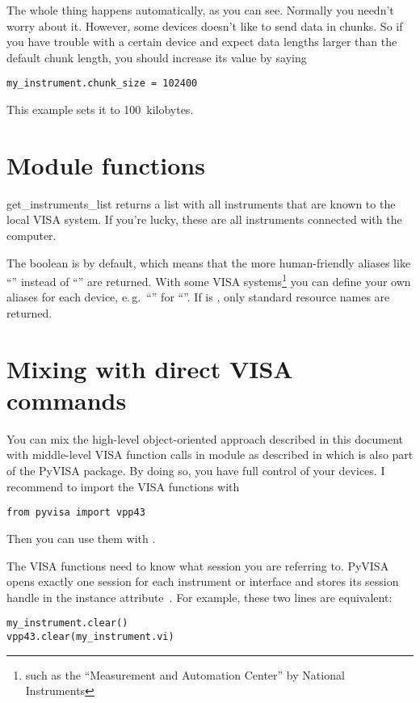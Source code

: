 \documentclass{howto}
\begin{document}
The whole thing happens automatically, as you can see.  Normally you needn't
worry about it.  However, some devices doesn't like to send data in chunks.  So
if you have trouble with a certain device and expect data lengths larger than
the default chunk length, you should increase its value by saying
\begin{verbatim}
my_instrument.chunk_size = 102400
\end{verbatim}
This example sets it to 100~kilobytes.


\section{Module functions}

\begin{funcdesc}{get_instruments_list}{}
  returns a list with all instruments that are known to the local VISA system.
  If you're lucky, these are all instruments connected with the computer.

  The boolean  is  by default, which means that the
  more human-friendly aliases like ``'' instead of ``''
  are returned.  With some VISA systems\footnote{such as the ``Measurement and
    Automation Center'' by National Instruments} you can define your own
  aliases for each device, e.\,g.\ ``'' for
  ``''.  If  is , only
  standard resource names are returned.
\end{funcdesc}


\section{Mixing with direct VISA commands}

You can mix the high-level object-oriented approach described in this document
with middle-level VISA function calls in module  as described in
 which is also part of the PyVISA package.  By doing so, you
have full control of your devices.  I recommend to import the VISA functions
with
\begin{verbatim}
from pyvisa import vpp43
\end{verbatim}
Then you can use them with .

The VISA functions need to know what session you are referring to.  PyVISA
opens exactly one session for each instrument or interface and stores its
session handle in the instance attribute~.  For example, these two
lines are equivalent:
\begin{verbatim}
my_instrument.clear()
vpp43.clear(my_instrument.vi)
\end{verbatim}
\end{document}
